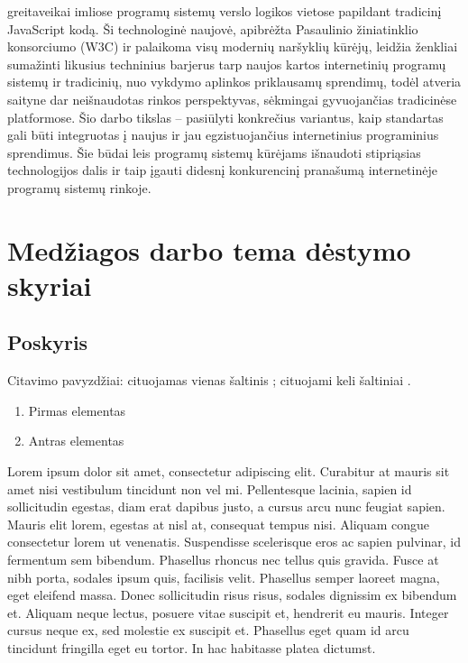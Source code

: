 \documentclass{VUMIFPSkursinis}
\begin{document}
greitaveikai imliose programų sistemų verslo logikos vietose papildant tradicinį JavaScript 
kodą. Ši technologinė naujovė, apibrėžta Pasaulinio žiniatinklio konsorciumo (W3C) ir palaikoma
 visų modernių naršyklių kūrėjų, leidžia ženkliai sumažinti likusius techninius barjerus tarp 
 naujos kartos internetinių programų sistemų ir tradicinių, nuo vykdymo aplinkos priklausamų 
 sprendimų, todėl atveria saityne dar neišnaudotas rinkos perspektyvas, sėkmingai gyvuojančias
tradicinėse platformose. Šio darbo tikslas – pasiūlyti konkrečius variantus, kaip standartas 
gali būti integruotas į naujus ir jau egzistuojančius internetinius programinius sprendimus. 
Šie būdai leis programų sistemų kūrėjams išnaudoti stipriąsias technologijos dalis ir taip 
įgauti didesnį konkurencinį pranašumą internetinėje programų sistemų rinkoje.

\section{Medžiagos darbo tema dėstymo skyriai}


\subsection{Poskyris}
Citavimo pavyzdžiai: cituojamas vienas šaltinis \cite{PvzStraipsnLt}; cituojami
keli šaltiniai \cite{PvzStraipsnEn, PvzKonfLt, PvzKonfEn, PvzKnygLt, PvzKnygEn,
PvzElPubLt, PvzElPubEn, PvzMagistrLt, PvzPhdEn}.

\begin{enumerate}
	\item Pirmas elementas
	\item Antras elementas
\end{enumerate}

Lorem ipsum dolor sit amet, consectetur adipiscing elit. Curabitur at mauris sit amet nisi vestibulum tincidunt non vel mi. Pellentesque lacinia, sapien id sollicitudin egestas, diam erat dapibus justo, a cursus arcu nunc feugiat sapien. Mauris elit lorem, egestas at nisl at, consequat tempus nisi. Aliquam congue consectetur lorem ut venenatis. Suspendisse scelerisque eros ac sapien pulvinar, id fermentum sem bibendum. Phasellus rhoncus nec tellus quis gravida. Fusce at nibh porta, sodales ipsum quis, facilisis velit. Phasellus semper laoreet magna, eget eleifend massa. Donec sollicitudin risus risus, sodales dignissim ex bibendum et. Aliquam neque lectus, posuere vitae suscipit et, hendrerit eu mauris. Integer cursus neque ex, sed molestie ex suscipit et. Phasellus eget quam id arcu tincidunt fringilla eget eu tortor. In hac habitasse platea dictumst.
\end{document}
